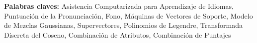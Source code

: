 \bigskip

\noindent\textbf{Palabras claves:} Asistencia Computarizada para Aprendizaje de Idiomas, Puntuación de la Pronunciación, Fono, Máquinas de Vectores de Soporte, Modelo de Mezclas Gaussianas, Supervectores, Polinomios de Legendre, Transformada Discreta del Coseno, Combinación de Atributos, Combinación de Puntajes

